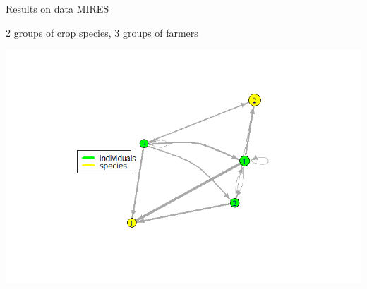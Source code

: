 \documentclass[compress,10pt]{beamer}
\begin{document}
\begin{frame}{Results on data MIRES}

2 groups of crop species, 3 groups of farmers

 \centering  \includegraphics[width =\linewidth]{plots/res_MIRES_MBM.png}



 \end{frame}
 
    
\end{document}
